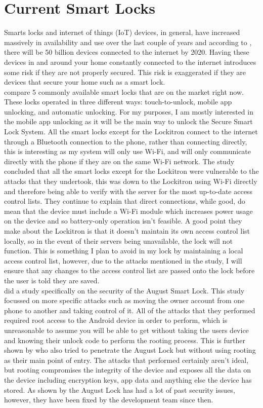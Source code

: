 \section{Current Smart Locks}
Smarts locks and internet of things (IoT) devices, in general, have increased massively in availability and use over the last couple of years and according to \cite{Buhov2016}, there will be 50 billion devices connected to the internet by 2020. Having these devices in and around your home constantly connected to the internet introduces some risk if they are not properly secured. This risk is exaggerated if they are devices that secure your home such as a smart lock.
\\
\indent\cite{Ho2016} compare 5 commonly available smart locks that are on the market right now. These locks operated in three different ways: touch-to-unlock, mobile app unlocking, and automatic unlocking. For my purposes, I am mostly interested in the mobile app unlocking as it will be the main way to unlock the Secure Smart Lock System. All the smart locks except for the Lockitron connect to the internet through a Bluetooth connection to the phone, rather than connecting directly, this is interesting as my system will only use Wi-Fi, and will only communicate directly with the phone if they are on the same Wi-Fi network.  The study concluded that all the smart locks except for the Lockitron were vulnerable to the attacks that they undertook, this was down to the Lockitron using Wi-Fi directly and therefore being able to verify with the server for the most up-to-date access control lists. They continue to explain that direct connections, while good, do mean that the device must include a Wi-Fi module which increases power usage on the device and so battery-only operation isn't feasible. A good point they make about the Lockitron is that it doesn't maintain its own access control list locally, so in the event of their servers being unavailable, the lock will not function. This is something I plan to avoid in my lock by maintaining a local access control list, however, due to the attacks mentioned in the study, I will ensure that any changes to the access control list are passed onto the lock before the user is told they are saved.
\\
\indent\cite{Ye2017} did a study specifically on the security of the August Smart Lock. This study focussed on more specific attacks such as moving the owner account from one phone to another and taking control of it. All of the attacks that they performed required root access to the Android device in order to perform, which is unreasonable to assume you will be able to get without taking the users device and knowing their unlock code to perform the rooting process. This is further shown by \cite{Fuller2017} who also tried to penetrate the August Lock but without using rooting as their main point of entry. The attacks that \cite{Ye2017} performed certainly aren't ideal, but rooting compromises the integrity of the device and exposes all the data on the device including encryption keys, app data and anything else the device has stored. As shown by \cite{Fuller2017} the August Lock has had a lot of past security issues, however, they have been fixed by the development team since then.

